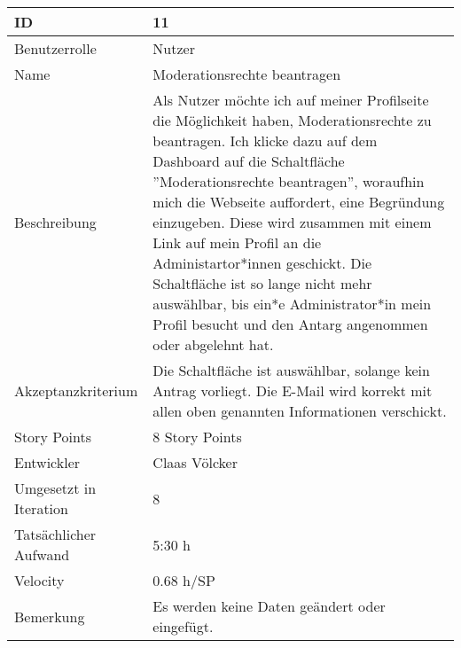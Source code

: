 \begin{tabularx}{\textwidth}{|p{}|X|}
	\hline
	ID & 11\\
	\hline
	Benutzerrolle & Nutzer\\
	\hline
	Name & Moderationsrechte beantragen\\
	\hline
	Beschreibung & Als Nutzer möchte ich auf meiner Profilseite die Möglichkeit haben, Moderationsrechte zu beantragen. Ich klicke dazu auf dem Dashboard auf die Schaltfläche ''Moderationsrechte beantragen'', woraufhin mich die Webseite auffordert, eine Begründung einzugeben. Diese wird zusammen mit einem Link auf mein Profil an die Administartor*innen geschickt. Die Schaltfläche ist so lange nicht mehr auswählbar, bis ein*e Administrator*in mein Profil besucht und den Antarg angenommen oder abgelehnt hat.\\
	\hline
	Akzeptanzkriterium & Die Schaltfläche ist auswählbar, solange kein Antrag vorliegt. Die E-Mail wird korrekt mit allen oben genannten Informationen verschickt.\\
	\hline
	Story Points & 8 Story Points\\
	\hline
	Entwickler & Claas Völcker\\
	\hline
	Umgesetzt in Iteration & 8\\
	\hline
	Tatsächlicher Aufwand & 5:30 h\\
	\hline
	Velocity & 0.68 h/SP\\
	\hline
	Bemerkung & Es werden keine Daten geändert oder eingefügt.\\
	\hline
\end{tabularx}
\vspace{20pt}
